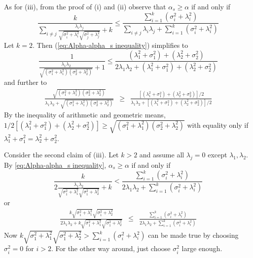 \documentclass{article}
\makeatletter
\theoremstyle{plain}
\theoremstyle{plain}
\theoremstyle{definition}
\theoremstyle{remark}
\theoremstyle{definition}
\theoremstyle{plain}
\theoremstyle{plain}
\theoremstyle{definition}
\newenvironment{proof}[1][\protect\proofname]{\par
	\normalfont\topsep6\p@\@plus6\p@\relax
	\trivlist
	\itemindent\parindent
	\item[\hskip\labelsep\scshape #1]\ignorespaces
}{%
	\endtrivlist\@endpefalse
}
\providecommand{\proofname}{Proof}
\makeatother
\begin{document}
\begin{proof}[Proof of Proposition \ref{prop:Reliabilities.}]
As for (iii), from the proof of (i) and (ii) observe that $\alpha_{s}\geq\alpha$
if and only if
\begin{equation}
\label{eq:Alpha-alpha_s inequality}
\frac{k}{\sum_{i\neq j}\frac{\lambda_{i}\lambda_{j}}{\sqrt{\sigma_{i}^{2}+\lambda_{i}^{2}}\sqrt{\sigma_{j}^{2}+\lambda_{j}^{2}}}+k}\leq\frac{\sum_{i=1}^{k}\left(\sigma_{i}^{2}+\lambda_{i}^{2}\right)}{\sum_{i\neq j}\lambda_{i}\lambda_{j}+\sum_{i=1}^{k}\left(\sigma_{i}^{2}+\lambda_{i}^{2}\right)}
\end{equation}
Let $k=2$. Then (\ref{eq:Alpha-alpha_s inequality}) simplifies to
\[
\frac{1}{\frac{\lambda_{1}\lambda_{2}}{\sqrt{\left(\sigma_{1}^{2}+\lambda_{1}^{2}\right)\left(\sigma_{2}^{2}+\lambda_{2}^{2}\right)}}+1}\leq\frac{\left(\lambda_{1}^{2}+\sigma_{1}^{2}\right)+\left(\lambda_{2}^{2}+\sigma_{2}^{2}\right)}{2\lambda_{1}\lambda_{2}+\left(\lambda_{1}^{2}+\sigma_{1}^{2}\right)+\left(\lambda_{2}^{2}+\sigma_{2}^{2}\right)}
\]
and further to
\begin{eqnarray*}
\frac{\sqrt{\left(\sigma_{1}^{2}+\lambda_{1}^{2}\right)\left(\sigma_{2}^{2}+\lambda_{2}^{2}\right)}}{\lambda_{1}\lambda_{2}+\sqrt{\left(\sigma_{1}^{2}+\lambda_{1}^{2}\right)\left(\sigma_{2}^{2}+\lambda_{2}^{2}\right)}} & \geq & \frac{\left[\left(\lambda_{1}^{2}+\sigma_{1}^{2}\right)+\left(\lambda_{2}^{2}+\sigma_{2}^{2}\right)\right]/2}{\lambda_{1}\lambda_{2}+\left[\left(\lambda_{1}^{2}+\sigma_{1}^{2}\right)+\left(\lambda_{2}^{2}+\sigma_{2}^{2}\right)\right]/2}
\end{eqnarray*}
By the inequality of arithmetic and geometric means, $1/2\left[\left(\lambda_{1}^{2}+\sigma_{1}^{2}\right)+\left(\lambda_{2}^{2}+\sigma_{2}^{2}\right)\right]\geq\sqrt{\left(\sigma_{1}^{2}+\lambda_{1}^{2}\right)\left(\sigma_{2}^{2}+\lambda_{2}^{2}\right)}$
with equality only if $\lambda_{1}^{2}+\sigma_{1}^{2}=\lambda_{2}^{2}+\sigma_{2}^{2}$.

Consider the second claim of (iii). Let $k>2$ and assume all $\lambda_{j}=0$
except $\lambda_{1},\lambda_{2}$. By \eqref{eq:Alpha-alpha_s inequality}, $\alpha_s \geq \alpha$ if and
only if
\[
\frac{k}{2\frac{\lambda_{1}\lambda_{2}}{\sqrt{\sigma_{1}^{2}+\lambda_{1}^{2}}\sqrt{\sigma_{1}^{2}+\lambda_{2}^{2}}}+k}<\frac{\sum_{i=1}^{k}\left(\sigma_{i}^{2}+\lambda_{i}^{2}\right)}{2\lambda_{1}\lambda_{2}+\sum_{i=1}^{k}\left(\sigma_{i}^{2}+\lambda_{i}^{2}\right)}
\]
or
\begin{eqnarray*}
\frac{k\sqrt{\sigma_{1}^{2}+\lambda_{1}^{2}}\sqrt{\sigma_{1}^{2}+\lambda_{2}^{2}}}{2\lambda_{1}\lambda_{2}+k\sqrt{\sigma_{1}^{2}+\lambda_{1}^{2}}\sqrt{\sigma_{1}^{2}+\lambda_{2}^{2}}} & \leq & \frac{\sum_{i=1}^{k}\left(\sigma_{i}^{2}+\lambda_{i}^{2}\right)}{2\lambda_{1}\lambda_{2}+\sum_{i=1}^{k}\left(\sigma_{i}^{2}+\lambda_{i}^{2}\right)}
\end{eqnarray*}
Now $k\sqrt{\sigma_{1}^{2}+\lambda_{1}^{2}}\sqrt{\sigma_{1}^{2}+\lambda_{2}^{2}}>\sum_{i=1}^{k}\left(\sigma_{i}^{2}+\lambda_{i}^{2}\right)$
can be made true by choosing $\sigma_{i}^{2}=0$ for $i>2$. For the
other way around, just choose $\sigma_{i}^{2}$ large enough.
\end{proof}
\end{document}
